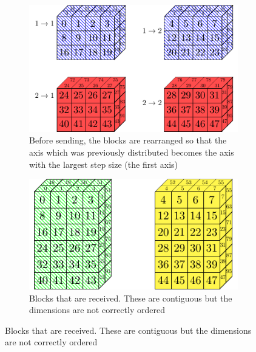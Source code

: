 \begin{figure}[p]
\begin{center}
 \begin{subfigure}[t]{0.45\textwidth}
  \centering
  \includegraphics[width=\textwidth]{Figs/SplitConcat3D/TransposedSendBlocks}
  \caption{\label{fig::3DSplitConcat send blocks T}Before sending, the blocks are rearranged so that the axis which was previously distributed becomes the axis with the largest step size (the first axis)}
 \end{subfigure}
 \hspace{0.05\textwidth}
 \begin{subfigure}[t]{0.45\textwidth}
  \centering
  \includegraphics[width=\textwidth]{Figs/SplitConcat3D/RecvLayout}
  \caption{\label{fig::3DSplitConcat recv blocks}Blocks that are received. These are contiguous but the dimensions are not correctly ordered}
 \end{subfigure}
 

\end{center}
\end{figure}

